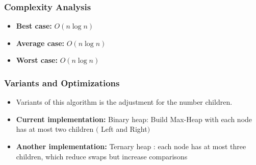 \subsubsection{Complexity Analysis}
\begin{itemize}
    \item \textbf{Best case:} $O(n \log n)$
    \item \textbf{Average case:} $O(n \log n)$
    \item \textbf{Worst case:} $O(n \log n)$
\end{itemize}

\subsubsection{Variants and Optimizations}
\begin{itemize}
    \item Variants of this algorithm is the adjustment for the number children.
    \item \textbf{Current implementation:  }Binary heap: Build Max-Heap with each node has at most two children $( $ Left and Right$)$
    \item \textbf{Another implementation: }Ternary heap \cite{johnson1975priority}: each node has at most three children, which reduce swaps but increase comparisons
\end{itemize}